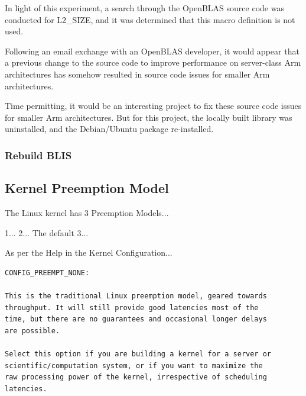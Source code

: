 \documentclass{report}
\begin{document}
In light of this experiment, a search through the OpenBLAS source code was conducted for L2\_SIZE, and it was determined that this macro definition is not used.

Following an email exchange with an OpenBLAS developer, it would appear that a previous change to the source code to improve performance on server-class Arm architectures has somehow resulted in source code issues for smaller Arm architectures.

Time permitting, it would be an interesting project to fix these source code issues for smaller Arm architectures. But for this project, the locally built library was uninstalled, and the Debian/Ubuntu package re-installed.


%
%
\subsubsection{Rebuild BLIS}


%
%
\subsection{Kernel Preemption Model}

The Linux kernel has 3 Preemption Models...

1...
2... The default
3...


As per the Help in the Kernel Configuration...

\lstset{style=listing}
\begin{lstlisting}[numbers=none, caption=Kernel Configuration Preemption Model Help]
CONFIG_PREEMPT_NONE:                                                                                                                                                                                                                                                 

This is the traditional Linux preemption model, geared towards
throughput. It will still provide good latencies most of the
time, but there are no guarantees and occasional longer delays
are possible.                                                                                                                       

Select this option if you are building a kernel for a server or
scientific/computation system, or if you want to maximize the
raw processing power of the kernel, irrespective of scheduling
latencies.
\end{lstlisting}
\end{document}
